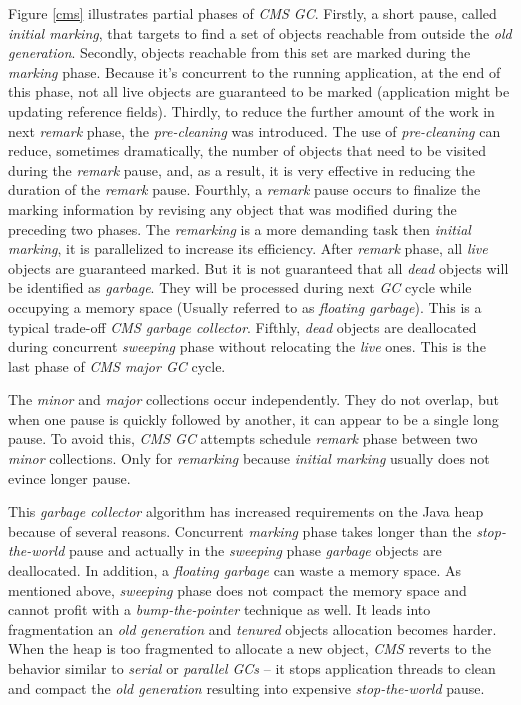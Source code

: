 \documentclass[
  digital, %
  oneside,
  notable, %
  nolof,     %
  nolot     %
]{fithesis3}
\begin{document}
Figure \ref{cms} illustrates partial phases of \textit{CMS GC}. Firstly, a short pause, called \textit{initial marking}, that targets to find a set of objects reachable from outside the \textit{old generation}. Secondly, objects reachable from this set are marked during the \textit{marking} phase. Because it's concurrent to the running application, at the end of this phase, not all live objects are guaranteed to be marked (application might be updating reference fields). Thirdly, to reduce the further amount of the work in next \textit{remark} phase, the \textit{pre-cleaning} was introduced. The use of \textit{pre-cleaning} can reduce, sometimes dramatically, the number of objects that need to be visited during the \textit{remark} pause, and, as a result, it is very effective in reducing the duration of the \textit{remark} pause. Fourthly, a \textit{remark} pause occurs to finalize the marking information by revising any object that was modified during the preceding two phases. The \textit{remarking} is a more demanding task then \textit{initial marking}, it is parallelized to increase its efficiency. After \textit{remark} phase, all \textit{live} objects are guaranteed marked. But it is not guaranteed that all \textit{dead} objects will be identified as \textit{garbage}. They will be processed during next \textit{GC} cycle while occupying a memory space (Usually referred to as \textit{floating garbage}). This is a typical trade-off \textit{CMS garbage collector}. Fifthly, \textit{dead} objects are deallocated during concurrent \textit{sweeping} phase without relocating the \textit{live} ones. This is the last phase of \textit{CMS major GC} cycle. \cite{scott} \cite{gctuning} \cite{hunt}

The \textit{minor} and \textit{major} collections occur independently. They do not overlap, but when one pause is quickly followed by another, it can appear to be a single long pause. To avoid this, \textit{CMS GC} attempts schedule \textit{remark} phase between two \textit{minor} collections. Only for \textit{remarking} because \textit{initial marking} usually does not evince longer pause.\cite{gctuning}


This \textit{garbage collector} algorithm has increased requirements on the Java heap because of several reasons. Concurrent \textit{marking} phase takes longer than the \textit{stop-the-world} pause and actually in the \textit{sweeping} phase \textit{garbage} objects are deallocated. In addition, a \textit{floating garbage} can waste a memory space. As mentioned above, \textit{sweeping} phase does not compact the memory space and cannot profit with a \textit{bump-the-pointer} technique as well. It leads into fragmentation an \textit{old generation} and \textit{tenured} objects allocation becomes harder. When the heap is too fragmented to allocate a new object, \textit{CMS} reverts to the behavior similar to \textit{serial} or \textit{parallel GCs} -- it stops application threads to clean and compact the \textit{old generation} resulting into expensive \textit{stop-the-world} pause. \cite{hunt}
\end{document}
